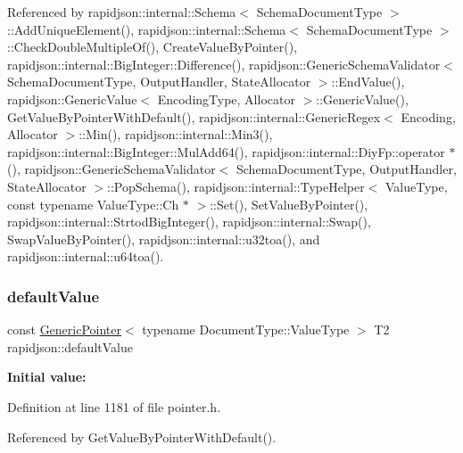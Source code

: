 Referenced by rapidjson\+::internal\+::\+Schema$<$ Schema\+Document\+Type $>$\+::\+Add\+Unique\+Element(), rapidjson\+::internal\+::\+Schema$<$ Schema\+Document\+Type $>$\+::\+Check\+Double\+Multiple\+Of(), Create\+Value\+By\+Pointer(), rapidjson\+::internal\+::\+Big\+Integer\+::\+Difference(), rapidjson\+::\+Generic\+Schema\+Validator$<$ Schema\+Document\+Type, Output\+Handler, State\+Allocator $>$\+::\+End\+Value(), rapidjson\+::\+Generic\+Value$<$ Encoding\+Type, Allocator $>$\+::\+Generic\+Value(), Get\+Value\+By\+Pointer\+With\+Default(), rapidjson\+::internal\+::\+Generic\+Regex$<$ Encoding, Allocator $>$\+::\+Min(), rapidjson\+::internal\+::\+Min3(), rapidjson\+::internal\+::\+Big\+Integer\+::\+Mul\+Add64(), rapidjson\+::internal\+::\+Diy\+Fp\+::operator $\ast$(), rapidjson\+::\+Generic\+Schema\+Validator$<$ Schema\+Document\+Type, Output\+Handler, State\+Allocator $>$\+::\+Pop\+Schema(), rapidjson\+::internal\+::\+Type\+Helper$<$ Value\+Type, const typename Value\+Type\+::\+Ch $\ast$ $>$\+::\+Set(), Set\+Value\+By\+Pointer(), rapidjson\+::internal\+::\+Strtod\+Big\+Integer(), rapidjson\+::internal\+::\+Swap(), Swap\+Value\+By\+Pointer(), rapidjson\+::internal\+::u32toa(), and rapidjson\+::internal\+::u64toa().

\mbox{\label{namespacerapidjson_a1591a36fec4c563e57394458a2fc508d}} 
\subsubsection{\texorpdfstring{defaultValue}{defaultValue}}
{\footnotesize\ttfamily const \mbox{\hyperlink{classrapidjson_1_1_generic_pointer}{Generic\+Pointer}}$<$ typename Document\+Type\+::\+Value\+Type $>$ T2 rapidjson\+::default\+Value}

{\bfseries Initial value\+:}
\begin{DoxyCode}{0}
\DoxyCodeLine{\{}

\end{DoxyCode}


Definition at line 1181 of file pointer.\+h.



Referenced by Get\+Value\+By\+Pointer\+With\+Default().

